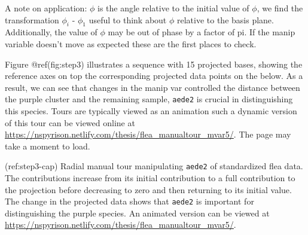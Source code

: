 A note on application: \(\phi\) is the angle relative to the initial value of \(\phi\), we find the transformation \(\phi_i\) - \(\phi_1\) useful to think about \(\phi\) relative to the basis plane. Additionally, the value of \(\phi\) may be out of phase by a factor of pi. If the manip variable doesn't move as expected these are the first places to check.

Figure @ref(fig:step3) illustrates a sequence with 15 projected bases, showing the reference axes on top the corresponding projected data points on the below. As a result, we can see that changes in the manip var controlled the distance between the purple cluster and the remaining sample, \texttt{aede2} is crucial in distinguishing this species. Tours are typically viewed as an animation such a dynamic version of this tour can be viewed online at \url{https://nspyrison.netlify.com/thesis/flea_manualtour_mvar5/}. The page may take a moment to load.

(ref:step3-cap) Radial manual tour manipulating \texttt{aede2} of standardized flea data. The contributions increase from its initial contribution to a full contribution to the projection before decreasing to zero and then returning to its initial value. The change in the projected data shows that \texttt{aede2} is important for distinguishing the purple species. An animated version can be viewed at \url{https://nspyrison.netlify.com/thesis/flea_manualtour_mvar5/}.

